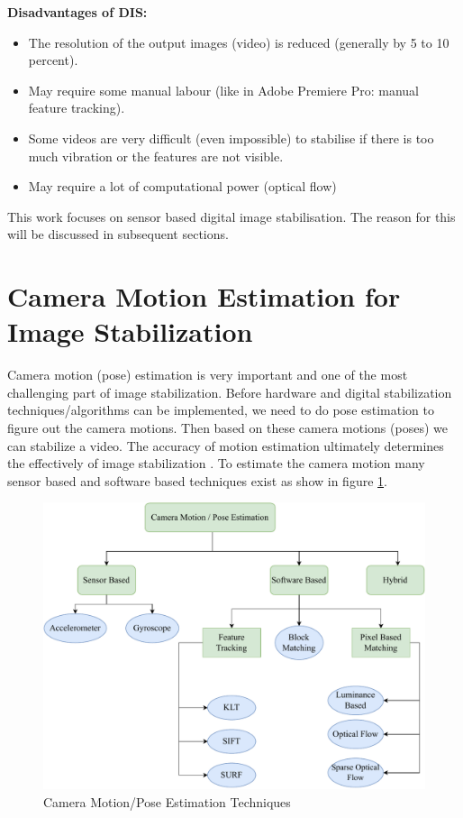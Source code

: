\textbf{Disadvantages of DIS:}
\begin{itemize}
\item The resolution of the output images (video) is reduced (generally by 5 to 10 percent).
\item May require some manual labour (like in Adobe Premiere Pro: manual feature tracking).
\item Some videos are very difficult (even impossible) to stabilise if there is too much vibration or the features are not visible.
\item May require a lot of computational power (optical flow)
\end{itemize}
This work focuses on sensor based digital image stabilisation. The reason for this will be discussed in subsequent sections. 

\section{Camera Motion Estimation for Image Stabilization}
\label{sec:pose_estimation}
Camera motion (pose) estimation is very important and one of the most challenging part of image stabilization. Before hardware and digital stabilization techniques/algorithms can be implemented, we need to do pose estimation to figure out the camera motions. Then based on these camera motions (poses) we can stabilize a video. The accuracy of motion estimation ultimately determines the effectively of image stabilization \citep{ryu2012robust}. To estimate the camera motion many sensor based and software based techniques exist as show in figure \ref{fig:cam_pose_est}. 

\begin{figure}
\centering
\includegraphics[scale=0.6]{images/fig_chapter2/cam_pose_estimation.pdf}
\caption{Camera Motion/Pose Estimation Techniques}
\label{fig:cam_pose_est}
\end{figure}

